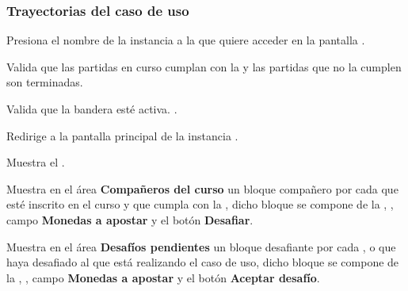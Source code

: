 \begin{UseCase}
{	}








\end{UseCase}

\subsubsection{Trayectorias del caso de uso}

\begin{UCtrayectoria}%
%

    \Actor Presiona el nombre de la instancia a la que quiere acceder en la pantalla .

    \Sistema Valida que las partidas en curso cumplan con la  y las partidas que no la cumplen son terminadas.

    \Sistema Valida que la bandera  esté activa. .

    \Sistema Redirige a la pantalla principal de la instancia .

    \Sistema Muestra el .

    \Sistema Muestra en el área {\bf Compañeros del curso} un bloque compañero por cada  que esté inscrito en el curso y que cumpla con la , dicho bloque se compone de la , , campo {\bf Monedas a apostar} y el botón {\bf Desafiar}.

    \Sistema Muestra en el área {\bf Desafíos pendientes} un bloque desafiante por cada ,  o  que haya desafiado al  que está realizando el caso de uso, dicho bloque se compone de la , , campo {\bf Monedas a apostar} y el botón {\bf Aceptar desafío}.

\end{UCtrayectoria}

